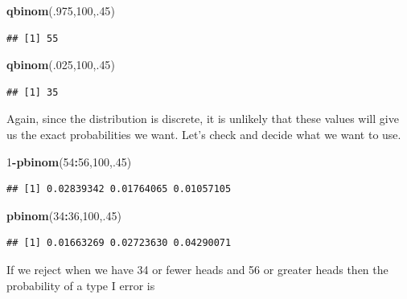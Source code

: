 \documentclass[]{book}
\newenvironment{Shaded}{\begin{snugshade}}{\end{snugshade}}
\newcommand{\KeywordTok}[1]{\textcolor[rgb]{0.13,0.29,0.53}{\textbf{#1}}}
\newcommand{\DecValTok}[1]{\textcolor[rgb]{0.00,0.00,0.81}{#1}}
\newcommand{\OperatorTok}[1]{\textcolor[rgb]{0.81,0.36,0.00}{\textbf{#1}}}
\newcommand{\NormalTok}[1]{#1}
\theoremstyle{definition}
\theoremstyle{definition}
\theoremstyle{definition}
\theoremstyle{remark}
\begin{document}
\begin{Shaded}
\begin{Highlighting}[]
\KeywordTok{qbinom}\NormalTok{(.}\DecValTok{975}\NormalTok{,}\DecValTok{100}\NormalTok{,.}\DecValTok{45}\NormalTok{)}
\end{Highlighting}
\end{Shaded}

\begin{verbatim}
## [1] 55
\end{verbatim}

\begin{Shaded}
\begin{Highlighting}[]
\KeywordTok{qbinom}\NormalTok{(.}\DecValTok{025}\NormalTok{,}\DecValTok{100}\NormalTok{,.}\DecValTok{45}\NormalTok{)}
\end{Highlighting}
\end{Shaded}

\begin{verbatim}
## [1] 35
\end{verbatim}

Again, since the distribution is discrete, it is unlikely that these
values will give us the exact probabilities we want. Let's check and
decide what we want to use.

\begin{Shaded}
\begin{Highlighting}[]
\DecValTok{1}\OperatorTok{-}\KeywordTok{pbinom}\NormalTok{(}\DecValTok{54}\OperatorTok{:}\DecValTok{56}\NormalTok{,}\DecValTok{100}\NormalTok{,.}\DecValTok{45}\NormalTok{)}
\end{Highlighting}
\end{Shaded}

\begin{verbatim}
## [1] 0.02839342 0.01764065 0.01057105
\end{verbatim}

\begin{Shaded}
\begin{Highlighting}[]
\KeywordTok{pbinom}\NormalTok{(}\DecValTok{34}\OperatorTok{:}\DecValTok{36}\NormalTok{,}\DecValTok{100}\NormalTok{,.}\DecValTok{45}\NormalTok{)}
\end{Highlighting}
\end{Shaded}

\begin{verbatim}
## [1] 0.01663269 0.02723630 0.04290071
\end{verbatim}

If we reject when we have 34 or fewer heads and 56 or greater heads then
the probability of a type I error is
\end{document}
